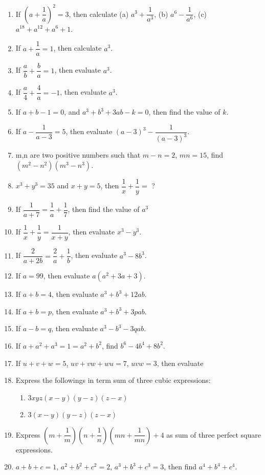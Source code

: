 \begin{enumerate}
		\item If \((a+\dfrac{1}{a})^2=3\), then calculate (a) $a^3+\dfrac{1}{a^3}$, (b) $a^6-\dfrac{1}{a^6}$, (c) $a^{18}+a^{12}+a^6+1$.
		\item If $a+\dfrac{1}{a}=1$, then calculate $a^3$.
		\item If $\dfrac{a}{b}+\dfrac{b}{a}=1$, then evaluate $a^3$.
		\item If $\dfrac{a}{4}+\dfrac{4}{a}=-1$, then evaluate $a^3$.
		\item If $a+b-1=0$, and $a^3+b^3+3ab-k=0$, then find the value of $k$.
		\item If $a-\dfrac{1}{a-3}=5$, then evaluate $(a-3)^3-\dfrac{1}{(a-3)^3}$.
		\item m,n are two positive numbers such that $m-n=2$, $mn=15$, find $(m^2-n^2)(m^3-n^3)$. %
		\item $x^3+y^3=35$ and $x+y=5$, then \(\dfrac{1}{x}+\dfrac{1}{y}=\) ?
		\item If $\dfrac{1}{a+7}=\dfrac{1}{a}+\dfrac{1}{7}$, then find the value of $a^3$
		\item If $\dfrac{1}{x}+\dfrac{1}{y}=\dfrac{1}{x+y}$, then evaluate $x^3-y^3$.
		\item If $\dfrac{2}{a+2b}=\dfrac{2}{a}+\dfrac{1}{b}$, then evaluate $a^3-8b^3$.
		\item If $a=99$, then evaluate $a(a^2+3a+3)$.
		\item If $a+b=4$, then evaluate $a^3+b^3+12ab$.
		\item If $a+b=p$, then evaluate $a^3+b^3+3pab$.
		\item If $a-b=q$, then evaluate $a^3-b^3-3qab$.
		\item If $a+a^2+a^3=1=a^2+b^2$, find $b^6-4b^4+8b^2$. %
		\item If $u+v+w=5$, $uv+vw+wu=7$, $uvw=3$, then evaluate 
		\item Express the followings in term sum of three cubic expressions:
			\begin{enumerate}[label=(\alph*)]
				\item $3xyz(x-y)(y-z)(z-x)$
				\item $3(x-y)(y-z)(z-x)$
			\end{enumerate}
		\item Express $\left(m+\dfrac{1}{m}\right)\left(n+\dfrac{1}{n}\right)\left(mn+\dfrac{1}{mn}\right)+4$ as sum of three perfect square expressions.


		


		\item $a+b+c=1$, $a^2+b^2+c^2=2$, $a^3+b^3+c^3=3$, then find $a^4+b^4+c^4$. %
		\end{enumerate}


